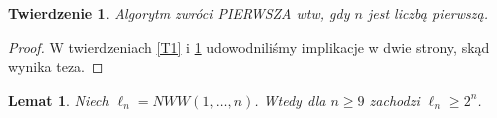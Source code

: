 \documentclass[declaration,shortabstract]{iithesis}
\theoremstyle{definition}
\theoremstyle{remark} \newtheorem{observation}{Obserwacja}
\theoremstyle{plain} \newtheorem{theorem}{Twierdzenie}
\theoremstyle{plain} \newtheorem{lemma}{Lemat}
\theoremstyle{remark} \newtheorem*{remark*}{Uwaga}
\theoremstyle{reminder} \newtheorem*{reminder*}{Przypomnienie}
\begin{document}
\begin{theorem} \label{T2}
	Algorytm zwróci \textit{PIERWSZA} wtw, gdy $n$ jest liczbą pierwszą.
\end{theorem}
	
\begin{proof}
	W twierdzeniach \ref{T1} i \ref{T2} udowodniliśmy implikacje w dwie strony, skąd wynika teza.
\end{proof}


\begin{lemma} \label{3.1}
	Niech $\ell_n = NWW(1, \dots, n)$. Wtedy dla $n \geq 9$ zachodzi $\ell_n \geq 2^n$.
\end{lemma}
	
\end{document}
